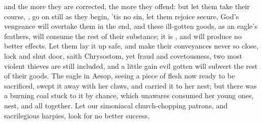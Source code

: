 {and the more they are corrected, the more they offend: but let them
take their course, , go on still as they begin,
'tis no sin, let them rejoice secure, God's vengeance will overtake
them in the end, and these ill-gotten goods, as an eagle's feathers,
 will consume the rest of their substance; it is , and will produce no better effects. Let them lay it
up safe, and make their conveyances never so close, lock and shut door,
saith Chrysostom, yet fraud and covetousness, two most violent thieves
are still included, and a little gain evil gotten will subvert the rest
of their goods. The eagle in Aesop, seeing a piece of flesh now ready
to be sacrificed, swept it away with her claws, and carried it to her
nest; but there was a burning coal stuck to it by chance, which
unawares consumed her young ones, nest, and all together. Let our
simoniacal church-chopping patrons, and sacrilegious harpies, look for
no better success.

}
